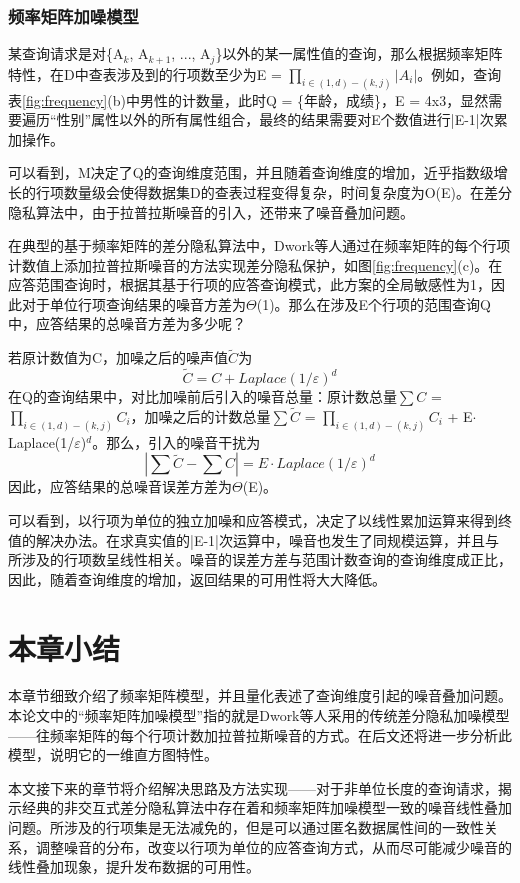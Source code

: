 \subsubsection{频率矩阵加噪模型}

某查询请求是对\{A$_{k}$, A$_{k+1}$, ..., A$_{j}$\}以外的某一属性值的查询，那么根据频率矩阵特性，在D中查表涉及到的行项数至少为E = \(\prod\nolimits_{i \in (1,d) - (k,j)} {|A{_i} |} \)。例如，查询表\ref{fig:frequency}(b)中男性的计数量，此时Q = \{年龄，成绩\}，E = 4x3，显然需要遍历“性别”属性以外的所有属性组合，最终的结果需要对E个数值进行|E-1|次累加操作。

可以看到，M决定了Q的查询维度范围，并且随着查询维度的增加，近乎指数级增长的行项数量级会使得数据集D的查表过程变得复杂，时间复杂度为O(E)。在差分隐私算法中，由于拉普拉斯噪音的引入，还带来了噪音叠加问题。

在典型的基于频率矩阵的差分隐私算法中\cite{Dwork Calibrating}，Dwork等人通过在频率矩阵的每个行项计数值上添加拉普拉斯噪音的方法实现差分隐私保护，如图\ref{fig:frequency}(c)。在应答范围查询时，根据其基于行项的应答查询模式，此方案的全局敏感性为1，因此对于单位行项查询结果的噪音方差为$\Theta$(1)。那么在涉及E个行项的范围查询Q中，应答结果的总噪音方差为多少呢？

若原计数值为C，加噪之后的噪声值$\tilde{C}$为
\[
\tilde{C} = C + Laplace(1/\varepsilon)^d
\]
在Q的查询结果中，对比加噪前后引入的噪音总量：原计数总量$\sum{C}$ = \(\prod\nolimits_{i \in (1,d) - (k,j)} {C{_i}} \)，加噪之后的计数总量$\sum{\tilde{C}}$ = \(\prod\nolimits_{i \in (1,d) - (k,j)} {C{_i}} \) + E$\cdotp$Laplace(1/$\varepsilon$)$^d$。那么，引入的噪音干扰为
\[
|\sum{\tilde{C}} - \sum{C}| = E \cdotp Laplace(1/\varepsilon)^d
\]
因此，应答结果的总噪音误差方差为$\Theta$(E)。

可以看到，以行项为单位的独立加噪和应答模式，决定了以线性累加运算来得到终值的解决办法。在求真实值的|E-1|次运算中，噪音也发生了同规模运算，并且与所涉及的行项数呈线性相关。噪音的误差方差与范围计数查询的查询维度成正比，因此，随着查询维度的增加，返回结果的可用性将大大降低。

\section{本章小结}

本章节细致介绍了频率矩阵模型，并且量化表述了查询维度引起的噪音叠加问题。本论文中的“频率矩阵加噪模型”指的就是Dwork等人采用的传统差分隐私加噪模型——往频率矩阵的每个行项计数加拉普拉斯噪音的方式。在后文还将进一步分析此模型，说明它的一维直方图特性。

本文接下来的章节将介绍解决思路及方法实现——对于非单位长度的查询请求，揭示经典的非交互式差分隐私算法中存在着和频率矩阵加噪模型一致的噪音线性叠加问题。所涉及的行项集是无法减免的，但是可以通过匿名数据属性间的一致性关系，调整噪音的分布，改变以行项为单位的应答查询方式，从而尽可能减少噪音的线性叠加现象，提升发布数据的可用性。


